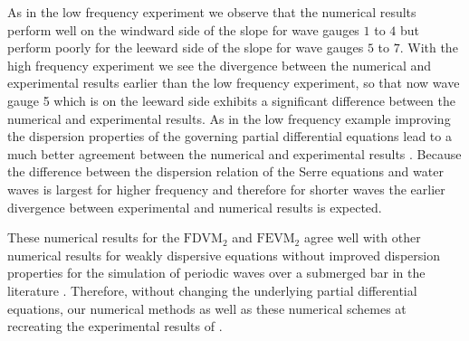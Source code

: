 As in the low frequency experiment we observe that the numerical results perform well on the windward side of the slope for wave gauges $1$ to $4$ but perform poorly for the leeward side of the slope for wave gauges $5$ to $7$. With the high frequency experiment we see the divergence between the numerical and experimental results earlier than the low frequency experiment, so that now wave gauge 5 which is on the leeward side exhibits a significant difference between the numerical and experimental results. As in the low frequency example improving the dispersion properties of the governing partial differential equations lead to a much better agreement between the numerical and experimental results \cite{Beji-Battjes-1994-1,Lannes-2013}. Because the difference between the dispersion relation of the Serre equations and water waves is largest for higher frequency and therefore for shorter waves \citet{Barthelemy-2004-315} the earlier divergence between experimental and numerical results is expected. 

These numerical results for the $\text{FDVM}_2$ and $\text{FEVM}_2$ agree well with other numerical results for weakly dispersive equations without improved dispersion properties for the simulation of periodic waves over a submerged bar in the literature \cite{Beji-Battjes-1994-1,Lannes-2013,Li-2014-169,Zhang-2013-13}. Therefore, without changing the underlying partial differential equations, our numerical methods as well as these numerical schemes at recreating the experimental results of \citet{Beji-Battjes-1994-1}.

